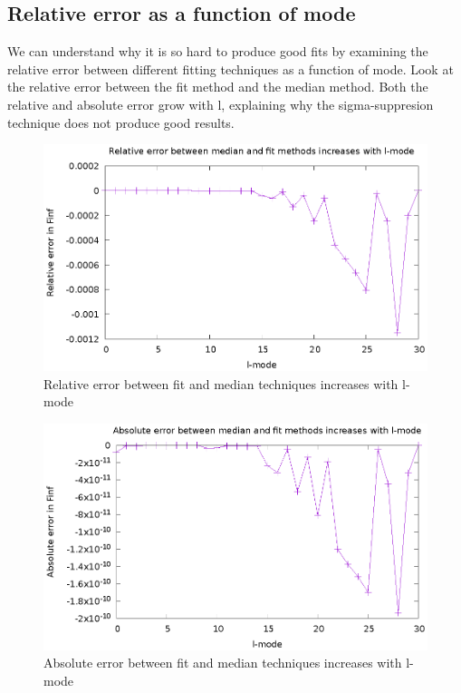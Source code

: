 


\subsection{Relative error as a function of mode}
We can understand why it is so hard to produce good fits by examining the relative error between different fitting techniques as a function of mode. Look at the relative error between the fit method and the median method. Both the relative and absolute error grow with l, explaining why the sigma-suppresion technique does not produce good results.

\begin{figure}
  \includegraphics{relErrorIncreaseslMode}
  \caption{Relative error between fit and median techniques increases with l-mode}
\end{figure}


\begin{figure}
  \includegraphics{absErrorIncreaseslmode}
  \caption{Absolute error between fit and median techniques increases with l-mode}
\end{figure}


